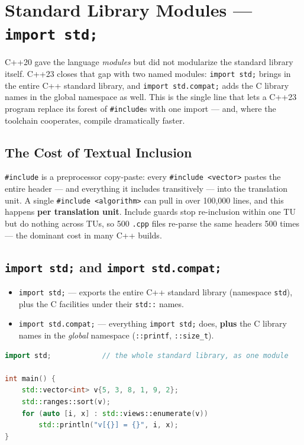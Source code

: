 \chapter{Standard Library Modules --- \texttt{import std;}}
\label{ch:standard-library-modules}

C++20 gave the language \emph{modules} but did not modularize the standard library itself. C++23 closes that gap with two named modules: \lstinline|import std;| brings in the entire C++ standard library, and \lstinline|import std.compat;| adds the C library names in the global namespace as well. This is the single line that lets a C++23 program replace its forest of \lstinline|#include|s with one import --- and, where the toolchain cooperates, compile dramatically faster.

\section{The Cost of Textual Inclusion}

\lstinline|#include| is a preprocessor copy-paste: every \lstinline|#include <vector>| pastes the entire header --- and everything it includes transitively --- into the translation unit. A single \lstinline|#include <algorithm>| can pull in over 100{,}000 lines, and this happens \textbf{per translation unit}. Include guards stop re-inclusion within one TU but do nothing across TUs, so 500 \lstinline|.cpp| files re-parse the same headers 500 times --- the dominant cost in many C++ builds.

\section{\texttt{import std;} and \texttt{import std.compat;}}

\begin{itemize}
    \item \lstinline|import std;| --- exports the entire C++ standard library (namespace \lstinline|std|), plus the C facilities under their \lstinline|std::| names.
    \item \lstinline|import std.compat;| --- everything \lstinline|import std;| does, \textbf{plus} the C library names in the \emph{global} namespace (\lstinline|::printf|, \lstinline|::size_t|).
\end{itemize}

\begin{lstlisting}[language=C++, caption={An entire program's includes replaced by one import}]
import std;            // the whole standard library, as one module

int main() {
    std::vector<int> v{5, 3, 8, 1, 9, 2};
    std::ranges::sort(v);
    for (auto [i, x] : std::views::enumerate(v))
        std::println("v[{}] = {}", i, x);
}
\end{lstlisting}

